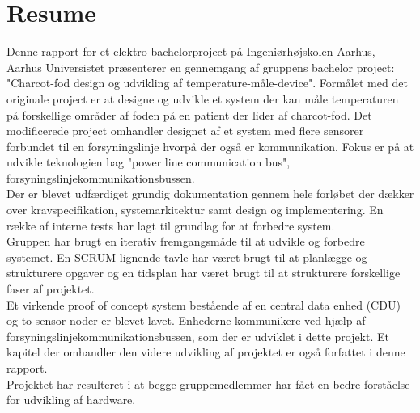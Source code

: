 \chapter{Resume}
Denne rapport for et elektro bachelorproject på Ingeniørhøjskolen Aarhus, Aarhus Universistet præsenterer en gennemgang af gruppens bachelor project: "Charcot-fod design og udvikling af temperature-måle-device". Formålet med det originale project er at designe og udvikle et system der kan måle temperaturen på forskellige områder af foden på en patient der lider af charcot-fod. Det modificerede project omhandler designet af et system med flere sensorer forbundet til en forsyningslinje hvorpå der også er kommunikation. Fokus er på at udvikle teknologien bag "power line communication bus", forsyningslinjekommunikationsbussen.\\
Der er blevet udfærdiget grundig dokumentation gennem hele forløbet der dækker over kravspecifikation, systemarkitektur samt design og implementering. En række af interne tests har lagt til grundlag for at forbedre system.\\
Gruppen har brugt en iterativ fremgangsmåde til at udvikle og forbedre systemet. En SCRUM-lignende tavle har været brugt til at planlægge og strukturere opgaver og en tidsplan har været brugt til at strukturere forskellige faser af projektet.\\
Et virkende proof of concept system bestående af en central data enhed (CDU) og to sensor noder er blevet lavet. Enhederne kommunikere ved hjælp af  forsyningslinjekommunikationsbussen, som der er udviklet i dette projekt. Et kapitel der omhandler den videre udvikling af projektet er også forfattet i denne rapport.\\
Projektet har resulteret i at begge gruppemedlemmer har fået en bedre forståelse for udvikling af hardware.